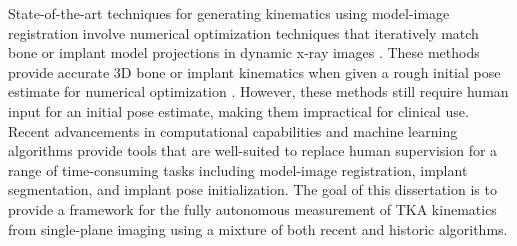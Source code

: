 State-of-the-art techniques for generating kinematics using model-image registration involve numerical optimization techniques that iteratively match bone or implant model projections in dynamic x-ray images \cite{postolkaEvaluationIntensitybasedAlgorithm2020,floodAutomatedRegistration3D2018,tsaiVolumetricModelbased2D2010}. These methods provide accurate 3D bone or implant kinematics when given a rough initial pose estimate for numerical optimization \cite{floodAutomatedRegistration3D2018}. However, these methods still require human input for an initial pose estimate, making them impractical for clinical use. 
Recent advancements in computational capabilities and machine learning algorithms provide tools that are well-suited to replace human supervision for a range of time-consuming tasks including model-image registration, implant segmentation, and implant pose initialization. The goal of this dissertation is to provide a framework for the fully autonomous measurement of TKA kinematics from single-plane imaging using a mixture of both recent and historic algorithms.
